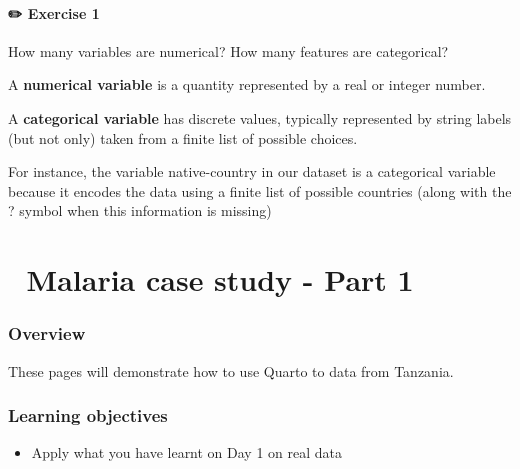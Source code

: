 \documentclass[
  letterpaper,
  DIV=11,
  numbers=noendperiod,
  oneside]{scrreprt}
\providecommand{\tightlist}{%
  \setlength{\itemsep}{0pt}\setlength{\parskip}{0pt}}\usepackage{longtable,booktabs,array}
\begin{document}
\hypertarget{exercise-1-3}{%
\subsubsection{\texorpdfstring{{✏️} Exercise
1}{✏️ Exercise 1}}\label{exercise-1-3}}

How many variables are numerical? How many features are categorical?

\begin{tcolorbox}[enhanced jigsaw, colbacktitle=quarto-callout-note-color!10!white, titlerule=0mm, breakable, opacityback=0, opacitybacktitle=0.6, left=2mm, coltitle=black, colback=white, title=\textcolor{quarto-callout-note-color}{\faInfo}\hspace{0.5em}{Note}, rightrule=.15mm, colframe=quarto-callout-note-color-frame, toprule=.15mm, bottomtitle=1mm, toptitle=1mm, arc=.35mm, bottomrule=.15mm, leftrule=.75mm]
A \textbf{numerical variable} is a quantity represented by a real or
integer number.

A \textbf{categorical variable} has discrete values, typically
represented by string labels (but not only) taken from a finite list of
possible choices.
\end{tcolorbox}

For instance, the variable native-country in our dataset is a
categorical variable because it encodes the data using a finite list of
possible countries (along with the ? symbol when this information is
missing)

\hypertarget{malaria-case-study---part-1}{%
\chapter{\texorpdfstring{{📙} Malaria case study - Part
1}{📙 Malaria case study - Part 1}}\label{malaria-case-study---part-1}}

\hypertarget{overview-7}{%
\subsection{Overview}\label{overview-7}}

These pages will demonstrate how to use Quarto to data from Tanzania.

\hypertarget{learning-objectives-7}{%
\subsection{Learning objectives}\label{learning-objectives-7}}

\begin{itemize}
\tightlist
\item
  Apply what you have learnt on Day 1 on real data
\end{itemize}
\end{document}
